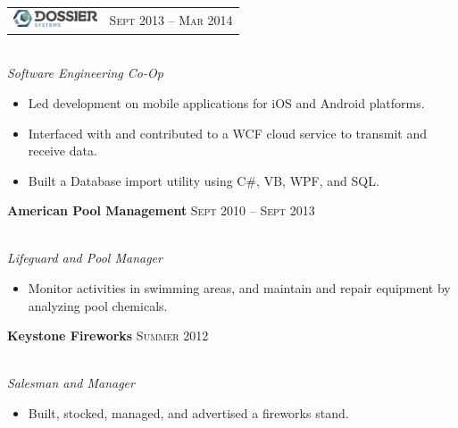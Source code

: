 \documentclass[10pt]{article}
\begin{document}
{\begin{minipage}[t]{0.5\textwidth}

\begin{tabular}{ L{5cm} R{3.5cm} }
\includegraphics[height=0.5cm]{dossier} & 
{\raggedleft\textsc{Sept 2013 -- Mar 2014}} \\
\end{tabular}
{\raggedright\large\\
\textit{Software Engineering Co-Op}\\[5pt]}



\begin{itemize}
  \setlength\itemsep{0.4mm}
  \item[\ding{226}] Led development on mobile applications for iOS and Android platforms.
  \item[\ding{226}] Interfaced with and contributed to a WCF cloud service to transmit and receive data.
  \item[\ding{226}] Built a Database import utility using C\#, VB, WPF, and SQL.
\end{itemize}

\textbf{American Pool Management} \hfill \textsc{Sept 2010 -- Sept 2013}
{\raggedright\large\\
\textit{Lifeguard and Pool Manager}\\[5pt]}
\vspace{-0.5 cm}
\begin{itemize}
  \item[\ding{226}] Monitor activities in swimming areas, and maintain and repair equipment by analyzing pool chemicals.
\end{itemize}

\textbf{Keystone Fireworks} \hfill \textsc{Summer 2012}
{\raggedright\large\\
\textit{Salesman and Manager}\\[5pt]}
\vspace{-0.5 cm}
\begin{itemize}
  \setlength\itemsep{0em}
  \item[\ding{226}] Built, stocked, managed, and advertised a fireworks stand.
\end{itemize}


\end{minipage}}
\end{document}
